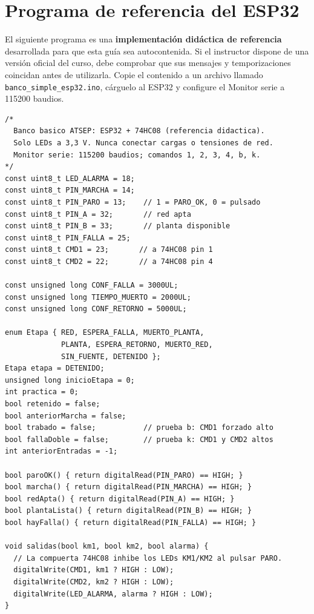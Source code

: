 \documentclass[11pt,a4paper]{article}
\begin{document}
\section{Programa de referencia del ESP32}\label{sec:programa}

El siguiente programa es una \textbf{implementación didáctica de referencia} desarrollada para que esta guía sea autocontenida. Si el instructor dispone de una versión oficial del curso, debe comprobar que sus mensajes y temporizaciones coincidan antes de utilizarla. Copie el contenido a un archivo llamado \texttt{banco\_simple\_esp32.ino}, cárguelo al ESP32 y configure el Monitor serie a 115200 baudios.

\begin{lstlisting}[style=ino,caption={Programa autónomo de referencia para las cuatro prácticas},label={lst:arduino}]
/*
  Banco basico ATSEP: ESP32 + 74HC08 (referencia didactica).
  Solo LEDs a 3,3 V. Nunca conectar cargas o tensiones de red.
  Monitor serie: 115200 baudios; comandos 1, 2, 3, 4, b, k.
*/
const uint8_t LED_ALARMA = 18;
const uint8_t PIN_MARCHA = 14;
const uint8_t PIN_PARO = 13;    // 1 = PARO_OK, 0 = pulsado
const uint8_t PIN_A = 32;       // red apta
const uint8_t PIN_B = 33;       // planta disponible
const uint8_t PIN_FALLA = 25;
const uint8_t CMD1 = 23;       // a 74HC08 pin 1
const uint8_t CMD2 = 22;       // a 74HC08 pin 4

const unsigned long CONF_FALLA = 3000UL;
const unsigned long TIEMPO_MUERTO = 2000UL;
const unsigned long CONF_RETORNO = 5000UL;

enum Etapa { RED, ESPERA_FALLA, MUERTO_PLANTA,
             PLANTA, ESPERA_RETORNO, MUERTO_RED,
             SIN_FUENTE, DETENIDO };
Etapa etapa = DETENIDO;
unsigned long inicioEtapa = 0;
int practica = 0;
bool retenido = false;
bool anteriorMarcha = false;
bool trabado = false;           // prueba b: CMD1 forzado alto
bool fallaDoble = false;        // prueba k: CMD1 y CMD2 altos
int anteriorEntradas = -1;

bool paroOK() { return digitalRead(PIN_PARO) == HIGH; }
bool marcha() { return digitalRead(PIN_MARCHA) == HIGH; }
bool redApta() { return digitalRead(PIN_A) == HIGH; }
bool plantaLista() { return digitalRead(PIN_B) == HIGH; }
bool hayFalla() { return digitalRead(PIN_FALLA) == HIGH; }

void salidas(bool km1, bool km2, bool alarma) {
  // La compuerta 74HC08 inhibe los LEDs KM1/KM2 al pulsar PARO.
  digitalWrite(CMD1, km1 ? HIGH : LOW);
  digitalWrite(CMD2, km2 ? HIGH : LOW);
  digitalWrite(LED_ALARMA, alarma ? HIGH : LOW);
}


\end{lstlisting}
\end{document}
